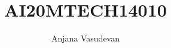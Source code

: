 \documentclass[journal,12pt,twocolumn]{IEEEtran}
\begin{document}
\makeatletter
{}
\makeatother
\let\StandardTheFigure\thefigure
\let\vec\mathbf
\renewcommand{\thefigure}{\theproblem}
\def\putbox#1#2#3{\makebox[0in][l]{\makebox[#1][l]{}\raisebox{\baselineskip}[0in][0in]{\raisebox{#2}[0in][0in]{#3}}}}
     \def\rightbox#1{\makebox[0in][r]{#1}}
     \def\centbox#1{\makebox[0in]{#1}}
     \def\topbox#1{\raisebox{-\baselineskip}[0in][0in]{#1}}
     \def\midbox#1{\raisebox{-0.5\baselineskip}[0in][0in]{#1}}
\vspace{3cm}
\title{AI20MTECH14010}
\author{Anjana Vasudevan}
%
%
%
% 
%
\end{document}
